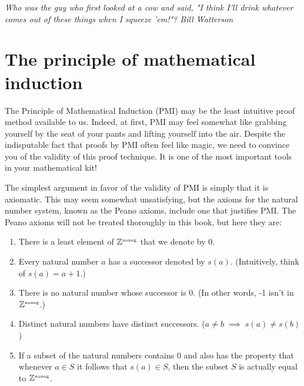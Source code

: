 \documentclass[10pt,]{book}
\theoremstyle{plain}
\theoremstyle{definition}
\theoremstyle{definition}
\numberwithin{equation}{section}
\renewcommand{\Naturals}{{\mathbb Z}^{\mbox{\tiny noneg}} }
\newcommand{\Naturals}{{\mathbb N}}
\begin{document}
      \emph{Who was the guy who first looked at a cow and said, "I think I'll drink whatever comes out of these things when I squeeze 'em!"? \textendash{}Bill Watterson}
\typeout{************************************************}
\typeout{************************************************}
\section[{The principle of mathematical induction}]{The principle of mathematical induction}\label{sec_induct}

    The Principle of Mathematical Induction (PMI) may be the least intuitive
    proof method available to us. Indeed, at first, PMI may feel somewhat like
    grabbing yourself by the seat of your pants and lifting yourself into
    the air. Despite the indisputable fact that proofs by PMI often feel
    like magic, we need to convince you of the validity of this proof
    technique. It is one of the most important tools in your mathematical
    kit!
\par

  The simplest argument in favor of the validity of PMI is simply that it is
  axiomatic. This may seem somewhat unsatisfying, but the axioms for
  the natural number system, known as the Peano axioms,
  include one that justifies PMI. The Peano axioms will not be treated
  thoroughly in this book, but here they are:

  \leavevmode%
\begin{enumerate}
\item\hypertarget{li-351}{}
        There is a least element of \(\Naturals\) that we denote by \(0\).
\item\hypertarget{li-352}{}
        Every natural number \(a\) has a successor denoted by \(s(a)\).
        (Intuitively, think of \(s(a) = a+1\).)
\item\hypertarget{li-353}{}
        There is no natural number whose successor is \(0\).  (In other
        words, -1 isn't in \(\Naturals\).)
\item\hypertarget{li-354}{}
        Distinct natural numbers have distinct successors.  
        (\(a \neq b \; \implies \; s(a) \neq s(b)\))
\item\hypertarget{li-355}{}
        If a subset of the natural numbers contains \(0\) and also has the
        property that whenever \(a \in S\) it follows that \(s(a) \in S\), then the
        subset \(S\) is actually equal to \(\Naturals\).
\end{enumerate}
\end{document}
